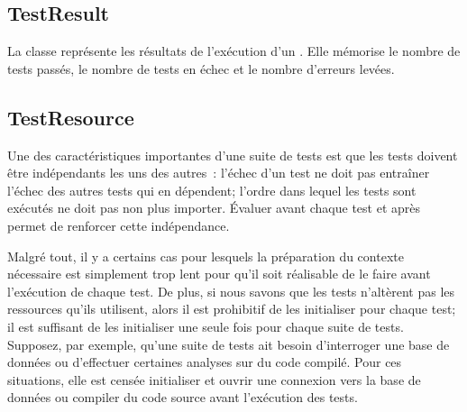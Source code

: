 \documentclass[a4paper,10pt,twoside]{book}
\begin{document}
\subsection{TestResult}

La classe  représente les résultats de l'exécution d'un . Elle mémorise le nombre de tests passés, le nombre de tests en échec et le nombre d'erreurs levées.

\subsection{TestResource}

Une des caractéristiques importantes d'une suite de tests est que les tests doivent être indépendants les uns des autres~: l'échec d'un test ne doit pas entraîner l'échec des autres tests qui en dépendent; l'ordre dans lequel les tests sont exécutés ne doit pas non plus importer.
\'Evaluer   avant chaque test et  après permet de renforcer cette indépendance.

Malgré tout, il y a certains cas pour lesquels la préparation du contexte nécessaire est simplement trop lent pour qu'il soit 
réalisable
de le faire avant l'exécution de chaque test. De plus, si nous savons que les tests n'altèrent pas les ressources qu'ils utilisent, alors il est prohibitif de les initialiser pour chaque test; il est suffisant de les initialiser une seule fois pour chaque suite de tests. Supposez, par exemple, qu'une suite de tests ait besoin d'interroger une base de données ou d'effectuer certaines analyses sur du code compilé.
Pour ces situations, elle est censée initialiser et ouvrir une
connexion vers la base de données ou compiler du code source avant
l'exécution des tests.
\end{document}
